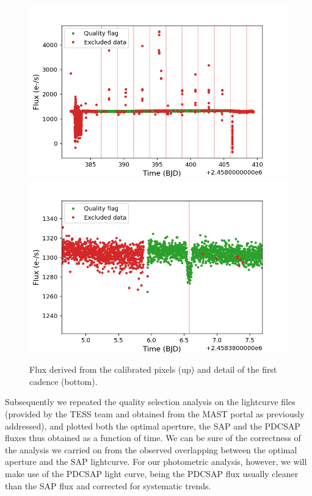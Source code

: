 \documentclass[a4paper,11pt,twocolumn]{article}
\begin{document}
\begin{figure}
    \centering
    \includegraphics[scale=0.3, angle=0]{../pictures/tess/tess.png}
    \includegraphics[scale=0.3, angle=0]{../pictures/tess/zoom.png}	
    \caption{Flux derived from the calibrated pixels (up) and detail of the first cadence (bottom).}
    \label{fig:tess}
\end{figure}



Subsequently we repeated the quality selection analysis on the lightcurve files (provided by the 
TESS team and obtained from the MAST portal as previously addressed), and plotted both the optimal 
aperture, the SAP and the PDCSAP fluxes thus obtained as a function of time. We can be sure of 
the correctness of the analysis we carried on from the observed overlapping between the optimal aperture and the SAP lightcurve. For our photometric analysis, however, we will make use of 
the PDCSAP light curve, being the PDCSAP flux usually cleaner than the SAP flux and corrected for systematic trends.
\end{document}
